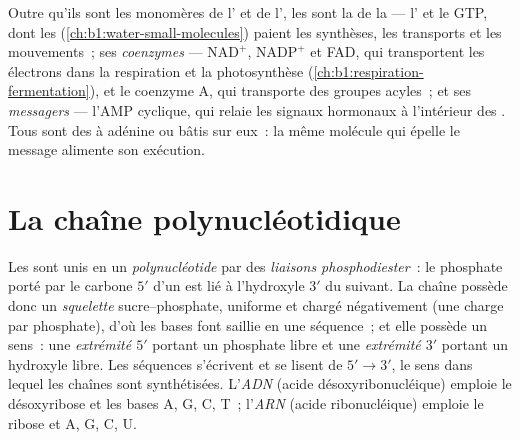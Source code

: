 \begin{proposition}\label{prop:b1:nucleic-acids:threejobs}
Outre qu'ils sont les monomères de l' et de l', les 
sont la \emph{} de la  --- l' et le GTP,
dont les 
(\cref{ch:b1:water-small-molecules}) paient les synthèses, les
transports et les mouvements~; ses \emph{coenzymes} --- $\mathrm{NAD^+}$,
$\mathrm{NADP^+}$ et FAD, qui transportent les électrons dans la
respiration et la photosynthèse
(\cref{ch:b1:respiration-fermentation}), et le coenzyme A, qui
transporte des groupes acyles~; et ses \emph{messagers} --- l'AMP
cyclique, qui relaie les signaux hormonaux à l'intérieur des .
Tous sont des  à adénine ou bâtis sur eux~: la même molécule
qui épelle le message alimente son exécution.
\end{proposition}

\section{La chaîne polynucléotidique}

\begin{definition}\label{def:b1:nucleic-acids:chain}
Les  sont unis en un \emph{polynucléotide}
par des \emph{liaisons phosphodiester}~: le
phosphate porté par le carbone $5'$ d'un  est lié à
l'hydroxyle $3'$ du suivant. La chaîne possède donc un
\emph{squelette} sucre--phosphate, uniforme et chargé négativement (une
charge par phosphate), d'où les bases font saillie en une séquence~; et
elle possède un sens~: une \emph{extrémité $5'$}
portant un phosphate libre et une \emph{extrémité
$3'$} portant un hydroxyle libre. Les
séquences s'écrivent et se lisent de $5' \to 3'$, le sens dans lequel
les chaînes sont synthétisées. L'\emph{ADN} (acide
désoxyribonucléique) emploie le désoxyribose et les bases A, G, C, T~;
l'\emph{ARN} (acide ribonucléique) emploie le ribose et A, G,
C, U.
\end{definition}

